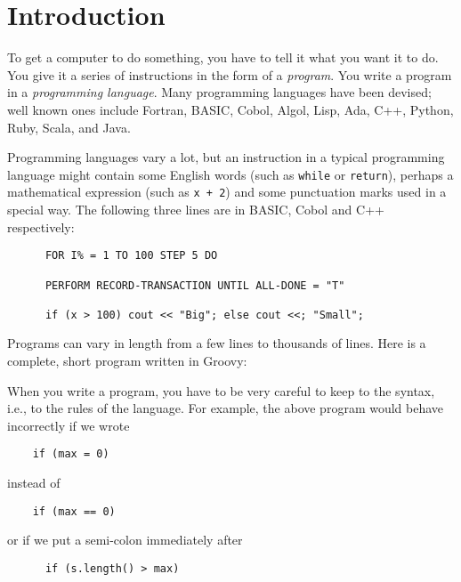 \section{Introduction}


To get a computer to do something, you have to tell it what you want it
to do.  You give it a series of instructions in the form of a \emph{program}.
You write a program in a \emph{programming language}.
Many programming languages have been devised; well known ones include
Fortran, BASIC, Cobol, Algol, Lisp, Ada, C++, Python, Ruby, Scala, and Java.

Programming languages vary a lot, but
an instruction in a typical programming language might contain
some English words (such as \verb!while! or \verb!return!), perhaps a mathematical
expression (such as \verb!x + 2!) and some punctuation marks used in a special way.
The following three lines are in BASIC, Cobol and C++ respectively:
\begin{Verbatim}
      FOR I% = 1 TO 100 STEP 5 DO

      PERFORM RECORD-TRANSACTION UNTIL ALL-DONE = "T"

      if (x > 100) cout << "Big"; else cout <<; "Small";
\end{Verbatim}

Programs can vary in length from a few lines to thousands of lines.
Here is a complete, short program written in Groovy:


When you write a program, you have to be very careful to keep to the
syntax, i.e., to the rules of the language.  For example, the above program would
behave incorrectly if we wrote 

\begin{Verbatim}
	if (max = 0)
\end{Verbatim}

instead of 

\begin{Verbatim}
	if (max == 0)
\end{Verbatim}

or if we put a semi-colon immediately after 

\begin{Verbatim}
      if (s.length() > max)
\end{Verbatim}


